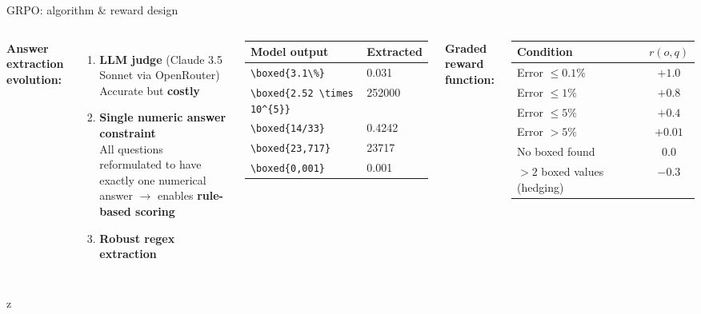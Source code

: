 \documentclass[aspectratio=169,10pt]{beamer}
\begin{document}
\begin{frame}{GRPO: algorithm \& reward design}
\begin{columns}[T]
\textbf{Answer extraction evolution:}
\vspace{0.3em}

\begin{enumerate}\small
  \item \textbf{LLM judge} (Claude 3.5 Sonnet via OpenRouter)\\
    Accurate but \textbf{costly}
  \item \textbf{Single numeric answer constraint}\\
    All questions reformulated to have exactly one numerical answer $\to$ enables \textbf{rule-based scoring}
  \item \textbf{Robust regex extraction}\\
\end{enumerate}

\vspace{0.2em}
\centering
\begin{tabular}{@{}ll@{}}
  \toprule
  \textbf{Model output} & \textbf{Extracted} \\
  \midrule
  \verb|\boxed{3.1\%}| & 0.031 \\
  \verb|\boxed{2.52 \times 10^{5}}| & 252000 \\
  \verb|\boxed{14/33}| & 0.4242 \\
  \verb|\boxed{23,717}| & 23717 \\
  \verb|\boxed{0,001}| & 0.001 \\
  \bottomrule
\end{tabular}

\vspace{2em}
\textbf{Graded reward function:}
\vspace{0.3em}

\centering
\begin{tabular}{@{}lc@{}}
  \toprule
  \textbf{Condition} & \textbf{$r(o,q)$} \\
  \midrule
  Error $\leq 0.1\%$ & $+1.0$ \\
  Error $\leq 1\%$ & $+0.8$ \\
  Error $\leq 5\%$ & $+0.4$ \\
  Error $> 5\%$ & $+0.01$ \\
  No boxed found & $0.0$ \\
  $>2$ boxed values (hedging) & $-0.3$ \\
  \bottomrule
\end{tabular}

\vspace{0.5em}
\end{columns}
z\end{frame}
\end{document}
